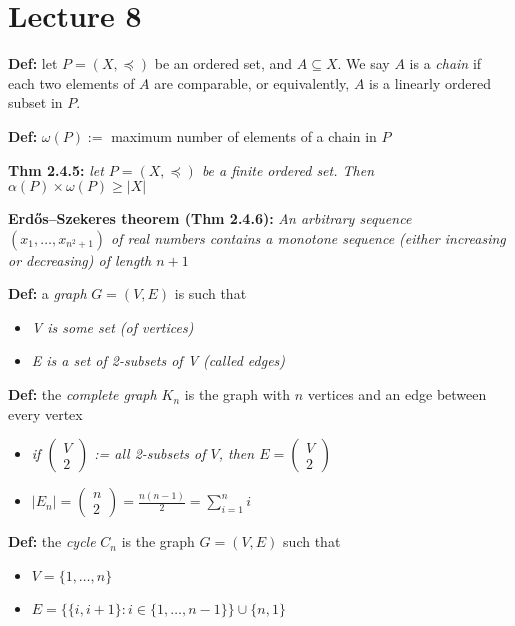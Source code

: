 \documentclass[12pt]{article}
\begin{document}
\section{Lecture 8}
\textbf{Def: }let $P = (X, \preceq)$ be an ordered set, and $A \subseteq X$. We say $A$ is a \emph{chain} if each two elements of $A$ are comparable, or equivalently, $A$ is a linearly ordered subset in $P$.

\textbf{Def: }\emph{$\omega(P) := $} maximum number of elements of a chain in $P$

\textbf{Thm 2.4.5: }\emph{let $P = (X, \preceq)$ be a finite ordered set. Then $\alpha(P) \times \omega(P) \geq |X|$}

\textbf{Erdős–Szekeres theorem (Thm 2.4.6): }\emph{An arbitrary sequence $(x_1, \dots, x_{n^2 + 1})$ of real numbers contains a monotone sequence (either increasing or decreasing) of length $n + 1$}

\textbf{Def: }a \emph{graph} $G = (V, E)$ is such that
\begin{itemize}
    \item \emph{V is some set (of vertices)}
    \item \emph{E is a set of 2-subsets of V (called edges)}
\end{itemize}

\textbf{Def: }the \emph{complete graph $K_n$} is the graph with $n$ vertices and an edge between every vertex
\begin{itemize}
    \item \emph{if $\begin{pmatrix} V \\ 2 \end{pmatrix}$ := all 2-subsets of $V$, then $E = \begin{pmatrix} V \\ 2 \end{pmatrix}$}
    \item \emph{$|E_n| = \begin{pmatrix} n \\ 2 \end{pmatrix} = \frac{n(n - 1)}{2} = \sum_{i = 1}^ni$}
\end{itemize}

\textbf{Def: }the \emph{cycle} $C_n$ is the graph $G = (V, E)$ such that
\begin{itemize}
    \item \emph{$V = \{ 1, \dots, n \}$}
    \item \emph{$E = \{ \{ i, i + 1 \} : i \in \{ 1, \dots, n - 1 \} \} \cup \{ n, 1\}$}
\end{itemize}
\end{document}
